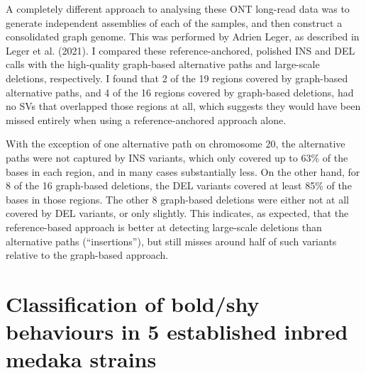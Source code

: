 \documentclass[
]{book}
\begin{document}
A completely different approach to analysing these ONT long-read data was to generate independent assemblies of each of the samples, and then construct a consolidated graph genome. This was performed by Adrien Leger, as described in Leger et al. (2021). I compared these reference-anchored, polished INS and DEL calls with the high-quality graph-based alternative paths and large-scale deletions, respectively. I found that 2 of the 19 regions covered by graph-based alternative paths, and 4 of the 16 regions covered by graph-based deletions, had no SVs that overlapped those regions at all, which suggests they would have been missed entirely when using a reference-anchored approach alone.

With the exception of one alternative path on chromosome 20, the alternative paths were not captured by INS variants, which only covered up to 63\% of the bases in each region, and in many cases substantially less. On the other hand, for 8 of the 16 graph-based deletions, the DEL variants covered at least 85\% of the bases in those regions. The other 8 graph-based deletions were either not at all covered by DEL variants, or only slightly. This indicates, as expected, that the reference-based approach is better at detecting large-scale deletions than alternative paths (``insertions''), but still misses around half of such variants relative to the graph-based approach.

\hypertarget{Pilot-chap}{%
\chapter{Classification of bold/shy behaviours in 5 established inbred medaka strains}\label{Pilot-chap}}

\end{document}
